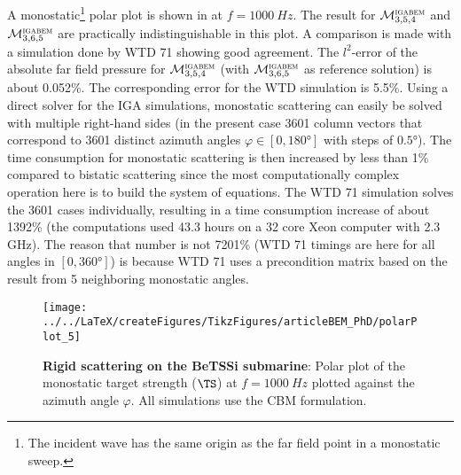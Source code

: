 A monostatic\footnote{The incident wave has the same origin as the far field point in a monostatic sweep.} polar plot is shown in  at $f=\SI{1000}{Hz}$. The result for ${\cal M}_{3,5,4}^{\textsc{igabem}}$ and ${\cal M}_{3,6,5}^{\textsc{igabem}}$ are practically indistinguishable in this plot. A comparison is made with a simulation done by WTD 71 showing good agreement. The $l^2$-error of the absolute far field pressure for ${\cal M}_{3,5,4}^{\textsc{igabem}}$ (with ${\cal M}_{3,6,5}^{\textsc{igabem}}$ as reference solution) is about 0.052\%. The corresponding error for the WTD simulation is 5.5\%. Using a direct solver for the IGA simulations, monostatic scattering can easily be solved with multiple right-hand sides (in the present case 3601 column vectors that correspond to 3601 distinct azimuth angles $\varphi\in[0,\ang{180}]$ with steps of $\ang{0.5}$). The time consumption for monostatic scattering is then increased by less than 1\% compared to bistatic scattering since the most computationally complex operation here is to build the system of equations. The WTD 71 simulation solves the 3601 cases individually, resulting in a time consumption increase of about 1392\% (the computations used \num{43.3} hours on a 32 core Xeon computer with 2.3 GHz). The reason that number is not 7201\% (WTD 71 timings are here for all angles in $[0,\ang{360}]$) is because WTD 71 uses a precondition matrix based on the result from 5 neighboring monostatic angles.
\begin{figure}
	\centering
	\texttt{[image: ../../LaTeX/createFigures/TikzFigures/articleBEM\_PhD/polarPlot\_5]}
	\caption{\textbf{Rigid scattering on the BeTSSi submarine}: Polar plot of the monostatic target strength ($\TS$) at $f=\SI{1000}{Hz}$ plotted against the azimuth angle $\varphi$. All simulations use the CBM formulation.} %
	\label{Fig3:BCA_MS}
\end{figure}

